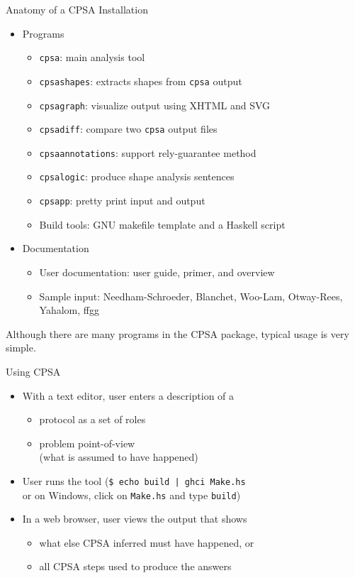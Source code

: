 \documentclass[landscape]{slides}
\newcommand{\cpsa}{CPSA}
\newenvironment{zitemize}
{\begin{itemize}
\setlength{\itemsep}{0em}
\setlength{\topsep}{0em}
\setlength{\partopsep}{0em}
\setlength{\parsep}{0em}
\setlength{\parskip}{0em}}%
{\end{itemize}}
\begin{document}
\begin{mitreslide}{Anatomy of a CPSA Installation}
\begin{zitemize}
\item Programs
\begin{zitemize}
\item \texttt{cpsa}: main analysis tool
\item \texttt{cpsashapes}: extracts shapes from \texttt{cpsa} output
\item \texttt{cpsagraph}: visualize output using XHTML and SVG
\item \texttt{cpsadiff}: compare two \texttt{cpsa} output files
\item \texttt{cpsaannotations}: support rely-guarantee method
\item \texttt{cpsalogic}: produce shape analysis sentences
\item \texttt{cpsapp}: pretty print input and output
\item Build tools: GNU makefile template and a Haskell script
\end{zitemize}
\item Documentation
\begin{zitemize}
\item User documentation: user guide, primer, and overview
\item Sample input: Needham-Schroeder, Blanchet, Woo-Lam, Otway-Rees,
  Yahalom, ffgg
\end{zitemize}
\end{zitemize}
\end{mitreslide}

\begin{note}
  Although there are many programs in the {\cpsa} package, typical
  usage is very simple.
\end{note}

\begin{mitreslide}{Using CPSA}
\begin{itemize}
\item With a text editor, user enters a description of a
\begin{zitemize}
\item protocol as a set of roles
\item problem point-of-view\\ (what is assumed to have happened)
\end{zitemize}
\item User runs the tool (\texttt{\$ echo build | ghci Make.hs} \\
  or on Windows, click on \texttt{Make.hs} and type \texttt{build})
\item In a web browser, user views the output that shows
\begin{zitemize}
\item what else CPSA inferred must have happened, or
\item all CPSA steps used to produce the answers
\end{zitemize}
\end{itemize}
\end{mitreslide}
\end{document}
